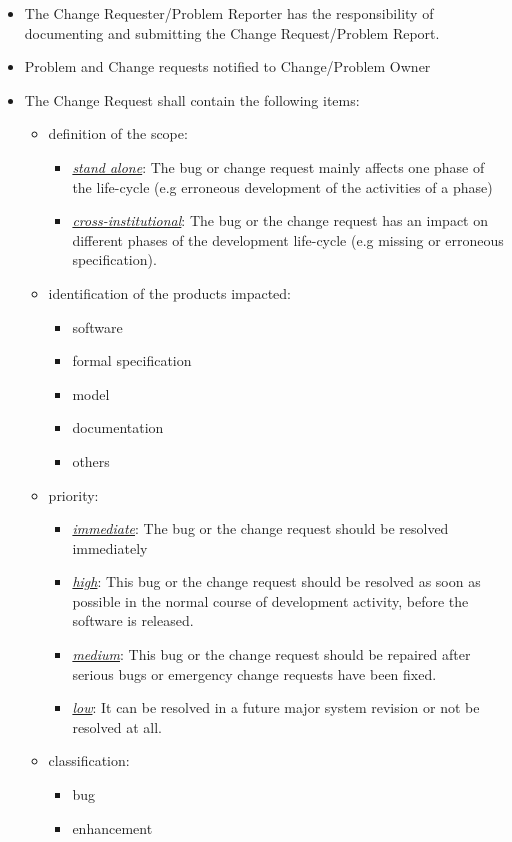 \documentclass{template/openetcs_article}
\begin{document}
\begin{itemize}
\item The Change Requester/Problem Reporter has the responsibility of
documenting and submitting the Change Request/Problem Report.
\item Problem and Change requests notified to Change/Problem Owner 
\item The Change Request shall contain the following items:
\begin{itemize}
\item definition of the scope: 
\begin{itemize}
\item \underline{\it stand alone}: The bug or change request mainly affects one phase of the life-cycle (e.g erroneous development of the activities of a phase)
\item \underline{\it cross-institutional}: The bug or the change request has an impact on different phases of the development life-cycle (e.g missing or erroneous specification).
\end{itemize}
\item identification of the products impacted:
\begin{itemize}
\item software
\item formal specification
\item model
\item documentation
\item others
\end{itemize}
\item priority: 
\begin{itemize}
\item \underline{\it immediate}: The bug or the change request should be resolved immediately
\item \underline{\it high}: This bug or the change request should be resolved as soon as possible in the normal course of development activity, before the software is released. 
\item \underline{\it medium}: This bug or the change request should be repaired after serious bugs or emergency change requests have been fixed. 
\item \underline{\it low}: It can be resolved in a future major system revision or not be resolved at all.
\end{itemize}
\item classification: 
\begin{itemize}
\item bug
\item enhancement

\end{itemize}
\end{itemize}
\end{itemize}
\end{document}
